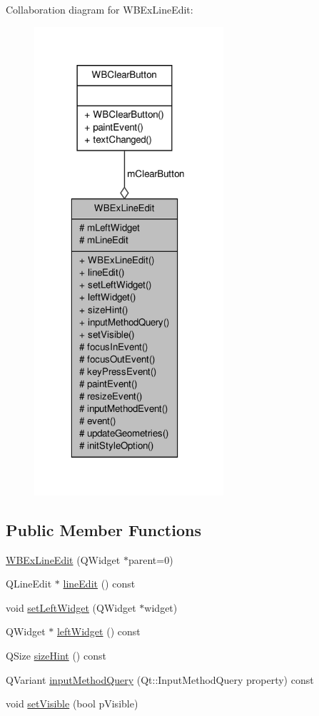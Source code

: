Collaboration diagram for W\-B\-Ex\-Line\-Edit\-:
\nopagebreak
\begin{figure}[H]
\begin{center}
\leavevmode
\includegraphics[width=199pt]{da/d77/class_w_b_ex_line_edit__coll__graph}
\end{center}
\end{figure}
\subsection*{Public Member Functions}
\begin{DoxyCompactItemize}
\item 
\hyperlink{class_w_b_ex_line_edit_a7e84a43757d628a94c07bc48465083e6}{W\-B\-Ex\-Line\-Edit} (Q\-Widget $\ast$parent=0)
\item 
Q\-Line\-Edit $\ast$ \hyperlink{class_w_b_ex_line_edit_ab4e568ff65b659f5b359f4a81ab54857}{line\-Edit} () const 
\item 
void \hyperlink{class_w_b_ex_line_edit_a95d98a004872d7ad5feb71601982a51f}{set\-Left\-Widget} (Q\-Widget $\ast$widget)
\item 
Q\-Widget $\ast$ \hyperlink{class_w_b_ex_line_edit_ad3f41d91b176b0b5d85b15d7d4fdad78}{left\-Widget} () const 
\item 
Q\-Size \hyperlink{class_w_b_ex_line_edit_ad496a3dd0488f3a254054697f7661314}{size\-Hint} () const 
\item 
Q\-Variant \hyperlink{class_w_b_ex_line_edit_a941060cd2e504e6b35900be50a20fef1}{input\-Method\-Query} (Qt\-::\-Input\-Method\-Query property) const 
\item 
void \hyperlink{class_w_b_ex_line_edit_ac67aa5012b828c4e29528cfe31eddde2}{set\-Visible} (bool p\-Visible)
\end{DoxyCompactItemize}
